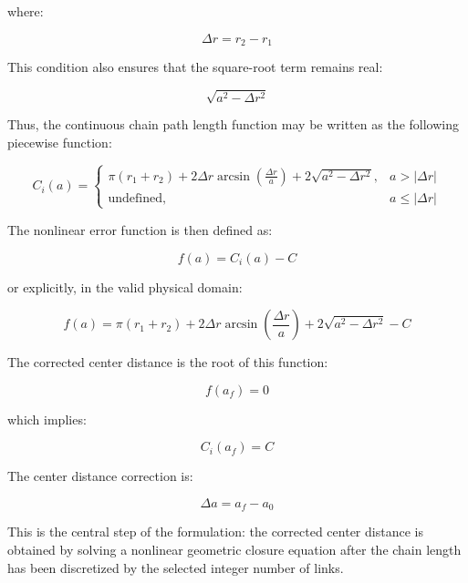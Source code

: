 \documentclass[11pt,a4paper]{article}
\begin{document}
where:

\begin{equation}
    \Delta r = r_2-r_1
\end{equation}

This condition also ensures that the square-root term remains real:

\begin{equation}
    \sqrt{a^2-\Delta r^2}
\end{equation}

Thus, the continuous chain path length function may be written as the following piecewise function:

\begin{equation}
    C_i(a) =
    \begin{cases}
    \pi(r_1+r_2)
    +
    2\Delta r \arcsin\left(\frac{\Delta r}{a}\right)
    +
    2\sqrt{a^2-\Delta r^2},
    & a > |\Delta r| \\[6pt]
    \text{undefined},
    & a \leq |\Delta r|
    \end{cases}
\end{equation}

The nonlinear error function is then defined as:

\begin{equation}
    f(a) = C_i(a) - C
\end{equation}

or explicitly, in the valid physical domain:

\begin{equation}
    f(a) =
    \pi(r_1+r_2)
    +
    2\Delta r \arcsin\left(\frac{\Delta r}{a}\right)
    +
    2\sqrt{a^2 - \Delta r^2}
    -
    C
\end{equation}

The corrected center distance is the root of this function:

\begin{equation}
    f(a_f) = 0
\end{equation}

which implies:

\begin{equation}
    C_i(a_f) = C
\end{equation}

The center distance correction is:

\begin{equation}
    \Delta a = a_f - a_0
\end{equation}

This is the central step of the formulation: the corrected center distance is obtained by solving a nonlinear geometric closure equation after the chain length has been discretized by the selected integer number of links.
\end{document}
